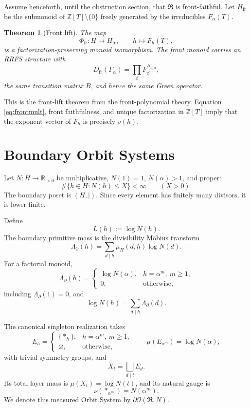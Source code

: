 \documentclass[11pt]{article}
\newcommand{\RR}{\mathbb R}
\newcommand{\ZZ}{\mathbb Z}
\newcommand{\cR}{\mathfrak R}
\newcommand{\cO}{\mathcal O}
\newcommand{\fr}{\mathrm{fr}}
\newcommand{\bd}{\partial}
\newcommand{\Lam}{\Lambda}
\newcommand{\Mob}{\mu}
\newcommand{\Div}{\mid}
\newtheorem{theorem}{Theorem}[section]
\begin{document}
Assume henceforth, until the obstruction section, that $\cR$ is front-faithful. Let $H_{\fr}$ be the submonoid of $\ZZ[T]\setminus\{0\}$ freely generated by the irreducibles $F_\alpha(T)$.

\begin{theorem}[Front lift]
The map
\[
\Phi_{\fr}:H\to H_{\fr},\qquad h\mapsto F_h(T),
\]
is a factorization-preserving monoid isomorphism. The front monoid carries an RRFS structure with
\[
D_{\fr}(F_\alpha)=\prod_\beta F_\beta^{B_{\beta,\alpha}},
\]
the same transition matrix $B$, and hence the same Green operator.
\end{theorem}

This is the front-lift theorem from the front-polynomial theory. Equation \eqref{eq:frontmult}, front faithfulness, and unique factorization in $\ZZ[T]$ imply that the exponent vector of $F_h$ is precisely $v(h)$.

\section{Boundary Orbit Systems}

Let $N:H\to\RR_{>0}$ be multiplicative, $N(1)=1$, $N(\alpha)>1$, and proper:
\[
\#\{h\in H:N(h)\le X\}<\infty
\qquad(X>0).
\]
The boundary poset is $(H,\Div)$. Since every element has finitely many divisors, it is lower finite.

Define
\[
L(h):=\log N(h).
\]
The boundary primitive mass is the divisibility M\"obius transform
\begin{equation}\label{eq:bdmass}
\Lam_{\bd}(h)
=
\sum_{d\Div h}\Mob_H(d,h)\log N(d).
\end{equation}
For a factorial monoid,
\begin{equation}\label{eq:mangoldt}
\Lam_{\bd}(h)=
\begin{cases}
\log N(\alpha),&h=\alpha^m,\ m\ge1,\\
0,&\text{otherwise},
\end{cases}
\end{equation}
including $\Lam_{\bd}(1)=0$, and
\begin{equation}\label{eq:inverse}
\log N(h)=\sum_{d\Div h}\Lam_{\bd}(d).
\end{equation}

The canonical singleton realization takes
\[
E_h=
\begin{cases}
\{\ast_h\},&h=\alpha^m,\ m\ge1,\\
\varnothing,&\text{otherwise},
\end{cases}
\qquad
\mu(E_{\alpha^m})=\log N(\alpha),
\]
with trivial symmetry groups, and
\[
X_t=\bigsqcup_{d\Div t}E_d.
\]
Its total layer mass is $\mu(X_t)=\log N(t)$, and its natural gauge is
\[
\nu(\ast_{\alpha^m})=N(\alpha^m).
\]
We denote this measured Orbit System by $\bd\cO(\cR,N)$.
\end{document}
